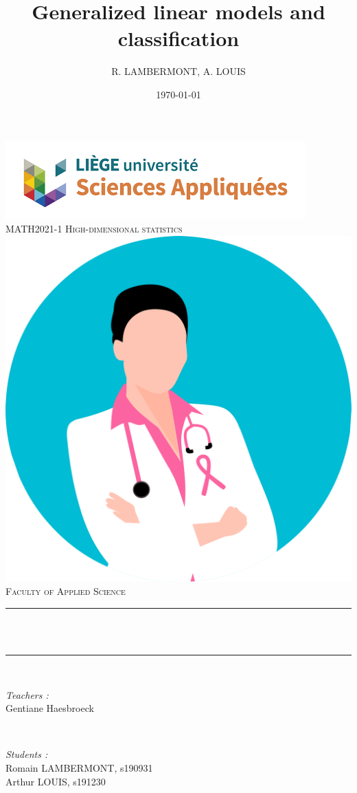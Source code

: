 \title{Generalized linear models and classification}								%
\author{R. LAMBERMONT, A. LOUIS}								%
\date{\today}											%

\makeatletter
\let\thetitle\@title
\let\theauthor\@author
\let\thedate\@date
\makeatother

\pagestyle{fancy}
\fancyhf{}
\rhead{\theauthor}
\lhead{\thetitle}
\cfoot{\thepage}

\begin{titlepage}
 \centering
 \vspace*{0.5 cm}
 \includegraphics[scale = 0.7]{figs/facsa.png}\\[1.0 cm]	%
 \textsc{\Large MATH2021-1 High-dimensional statistics}\\[1.5 cm]	%
 \includegraphics*[width=.3\textwidth]{figs/breast.png}\\[0.5 cm]
 \textsc{\LARGE \newline\newline Faculty of Applied Science}\\[0.5 cm]				%
 \rule{\linewidth}{0.2 mm} \\[0.4 cm]
 {\huge \bfseries \thetitle}\\
 \rule{\linewidth}{0.2 mm} \\[1.5 cm]

 \begin{minipage}{0.5\textwidth}
 	\begin{flushleft} \large
 		\emph{Teachers :}\\
 		Gentiane Haesbroeck\\
 		\end{flushleft}
 		\end{minipage}~
 		\begin{minipage}{0.4\textwidth}

 		\begin{flushright} \large
 		\emph{Students :} \\
        Romain LAMBERMONT, s190931\\
        Arthur LOUIS, s191230\\
 	\end{flushright}
 \end{minipage}\\[2 cm]

 \thedate
\end{titlepage}

\thispagestyle{empty}
\tableofcontents
\listoffigures
\listoftables
\pagebreak
\setcounter{page}{1}